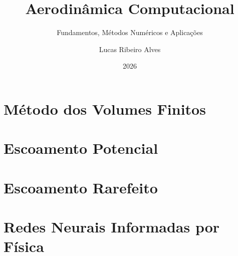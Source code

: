 \documentclass[brazil]{../../aerodynamics}
\title{Aerodinâmica Computacional}
\subtitle{Fundamentos, Métodos Numéricos e Aplicações}
\author{Lucas Ribeiro Alves}
\date{2026}
\begin{document}
    \frontmatter
    \maketitle
    \tableofcontents
    
    \mainmatter
    \part{Método dos Volumes Finitos}
    
    
    
    
    
    \part{Escoamento Potencial}

    \part{Escoamento Rarefeito}

    \part{Redes Neurais Informadas por Física}
\end{document}
